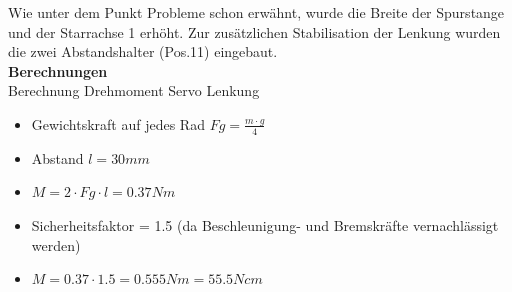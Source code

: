 Wie unter dem Punkt Probleme schon erwähnt, wurde die Breite der Spurstange und der Starrachse 1 erhöht. Zur zusätzlichen Stabilisation der Lenkung wurden die zwei Abstandshalter (Pos.11) eingebaut.\\[0.2cm]
\textbf{Berechnungen}\\[0.2cm]
Berechnung Drehmoment Servo Lenkung
\begin{itemize}
\item Gewichtskraft auf jedes Rad $Fg = \frac{m\cdot g}{4}$
\item Abstand $l = 30mm$
\item $M = 2\cdot Fg\cdot l = 0.37Nm$
\item Sicherheitsfaktor = 1.5 (da Beschleunigung- und Bremskräfte vernachlässigt werden)
\item $M = 0.37\cdot 1.5 = 0.555Nm = 55.5Ncm$
\end{itemize}